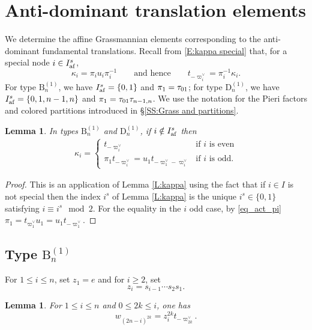 \documentclass[a4paper]{amsart}
\newtheorem{lem}[thm]{Lemma}
\theoremstyle{remark}
\numberwithin{equation}{section}
\begin{document}
{
\section{Anti-dominant translation elements}
\label{S:translation-factorization}

We determine the affine Grassmannian elements corresponding to the
anti-dominant fundamental translations.  Recall from
\eqref{E:kappa special} that, for a special node $i\in I_{\mathrm{af}}^s$,
\begin{equation}
\label{E:kappa-special-recalled}
  \kappa_i=\pi_i u_i\pi_i^{-1}
  \qquad\text{and hence}\qquad
  t_{-\varpi_i^\lor}=\pi_i^{-1}\kappa_i.
\end{equation}
For type $\mathrm{B}_n^{(1)}$, we have $I_{\mathrm{af}}^s=\{0,1\}$ and
$\pi_1=\tau_{01}$; for type $\mathrm{D}_n^{(1)}$, we have
$I_{\mathrm{af}}^s=\{0,1,n-1,n\}$ and $\pi_1=\tau_{01}\tau_{n-1,n}$.
We use the notation for the Pieri factors and colored partitions introduced
in \S \ref{SS:Grass and partitions}.

\begin{lem} 
In types $\mathrm{B}_n^{(1)}$ and $\mathrm{D}_n^{(1)}$, if $i\notin I_{\mathrm{af}}^s$ then
\begin{align}\label{E:kappa nonspecial}
\kappa_i = 
\begin{cases}
t_{-\varpi_i^\lor} & \text{if $i$ is even} \\
\pi_1 t_{-\varpi_i^\lor} = u_1 t_{-\varpi_1^\vee-\varpi_i^\vee}& \text{if $i$ is odd.}
\end{cases}
\end{align}
\end{lem}
\begin{proof} This is an application of Lemma \ref{L:kappa} using the fact that if $i\in I$ is not special
then the index $i^s$ of Lemma \ref{L:kappa} is the unique $i^s\in \{0,1\}$ satisfying $i\equiv i^s \mod 2$.
For the equality in the $i$ odd case, by \eqref{eq_act_pi} $\pi_1 = t_{\varpi_1^\vee} u_1= u_1 t_{-\varpi_1^\vee}$.
\end{proof}

\subsection{Type $\mathrm{B}_n^{(1)}$}

For $1\leq i\leq n$, set $z_1=e$ and for $i\ge 2$, set
\begin{equation}
\label{E:zi}
  z_i=s_{i-1}\dotsm s_2s_1.
\end{equation}

\begin{lem}
\label{L:B-even-rectangles}
For $1\leq i\leq n$ and $0\leq 2k\leq i$, one has
\begin{equation}
\label{E:B-even-rectangles}
  w_{(2n-i)^{2k}}=z_i^{2k}t_{-\varpi_{2k}^\lor}.
\end{equation}
\end{lem}

}
\end{document}
